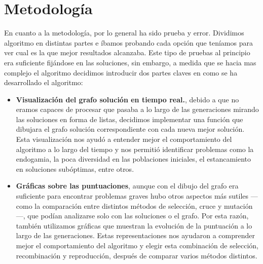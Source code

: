 \documentclass[12pt,a4paper]{report}
\begin{document}
    \section{Metodología}
        En cuanto a la metodología, por lo general ha sido prueba y error. Dividimos algoritmo en distintas partes e íbamos probando cada opción que teníamos para ver cual es la que mejor resultados alcanzaba.
        Este tipo de pruebas al principio era suficiente fijándose en las soluciones, sin embargo, a medida que se hacia mas complejo el algoritmo decidimos introducir dos partes claves en como se ha desarrollado el algoritmo:
        \begin{itemize}
            \item \textbf{Visualización del grafo solución en tiempo real.}, debido a que no eramos capaces de procesar que pasaba a lo largo de las generaciones mirando las soluciones en forma de listas, decidimos implementar una función que dibujara el grafo solución correspondiente con cada nueva mejor solución. Esta visualización nos ayudó a entender mejor el comportamiento del algoritmo a lo largo del tiempo y nos permitió identificar problemas como la endogamia, la poca diversidad en las poblaciones iniciales, el estancamiento en soluciones subóptimas, entre otros.
            \item \textbf{Gráficas sobre las puntuaciones}, aunque con el dibujo del grafo era suficiente para encontrar problemas graves hubo otros aspectos más sutiles —como la comparación entre distintos métodos de selección, cruce y mutación—, que podían analizarse solo con las soluciones o el grafo. Por esta razón, también utilizamos gráficas que muestran la evolución de la puntuación a lo largo de las generaciones. Estas representaciones nos ayudaron a comprender mejor el comportamiento del algoritmo y elegir esta combinación de selección, recombinación y reproducción, después de comparar varios métodos distintos.
        \end{itemize}
\end{document}
